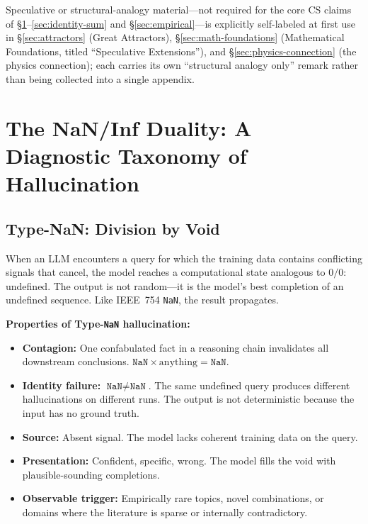 \documentclass[11pt]{article}
\theoremstyle{definition}
\theoremstyle{remark}
\newcommand{\NaN}{\texttt{NaN}}
\begin{document}
Speculative or structural-analogy material---not required for the core CS
claims of \S\ref{sec:taxonomy}--\ref{sec:identity-sum} and
\S\ref{sec:empirical}---is explicitly self-labeled at first use in
\S\ref{sec:attractors} (Great Attractors), \S\ref{sec:math-foundations}
(Mathematical Foundations, titled ``Speculative Extensions''), and
\S\ref{sec:physics-connection} (the physics connection); each carries its own
``structural analogy only'' remark rather than being collected into a single
appendix.

\section{The NaN/Inf Duality: A Diagnostic Taxonomy of Hallucination}
\label{sec:taxonomy}

\subsection{Type-NaN: Division by Void}
\label{sec:type-nan}

When an LLM encounters a query for which the training data contains conflicting
signals that cancel, the model reaches a computational state analogous to $0/0$:
undefined.  The output is not random---it is the model's best completion of an
undefined sequence.  Like IEEE~754 \NaN{}, the result propagates.

\medskip
\noindent\textbf{Properties of Type-\NaN{} hallucination:}
\begin{itemize}
  \item \textbf{Contagion:} One confabulated fact in a reasoning chain invalidates
    all downstream conclusions.  $\NaN \times \mathrm{anything} = \NaN$.
  \item \textbf{Identity failure:} $\NaN \neq \NaN$.  The same undefined query
    produces different hallucinations on different runs.  The output is not
    deterministic because the input has no ground truth.
  \item \textbf{Source:} Absent signal.  The model lacks coherent training data on
    the query.
  \item \textbf{Presentation:} Confident, specific, wrong.  The model fills the
    void with plausible-sounding completions.
  \item \textbf{Observable trigger:} Empirically rare topics, novel combinations,
    or domains where the literature is sparse or internally contradictory.
\end{itemize}
\end{document}
